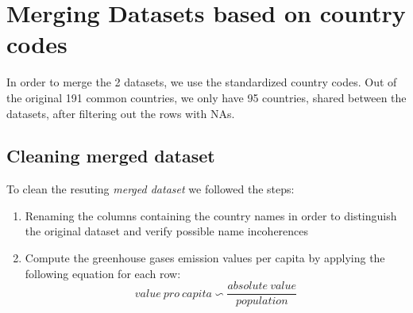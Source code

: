 \documentclass{article}
\begin{document}
	\section{Merging Datasets based on country codes}
	In order to merge the 2 datasets, we use the standardized country codes. Out of the original 191 common countries, we only have 95 countries, shared between the datasets, after filtering out the rows with NAs.
	
	\subsection{Cleaning merged dataset}
	To clean the resuting \textit{merged dataset} we followed the steps:
	\begin{enumerate}
		\item Renaming the columns containing the country names in order to distinguish the original dataset and verify possible name incoherences
		\item Compute the greenhouse gases emission values per capita by applying the following equation for each row:
		\begin{equation}
			value\ pro\ capita \backsim \frac{absolute\ value}{population}
		\end{equation}
	\end{enumerate}
	
\end{document}
